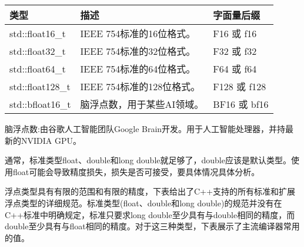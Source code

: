 \begin{longtable}{|l|l|l|}
\hline
\textbf{类型}    & \textbf{描述}                               & \textbf{字面量后缀} \\ \hline
\endfirsthead
%
\endhead
%
std::float16\_t  & IEEE 754标准的16位格式。         & F16 或 f16              \\ \hline
std::float32\_t  & IEEE 754标准的32位格式。          & F32 或 f32              \\ \hline
std::float64\_t  & IEEE 754标准的64位格式。          & F64 或 f64              \\ \hline
std::float128\_t & IEEE 754标准的128位格式。         & F128 或 f128            \\ \hline
std::bfloat16\_t & 脑浮点数，用于某些AI领域。 & BF16 或 bf16            \\ \hline
\end{longtable}

脑浮点数:由谷歌人工智能团队Google Brain开发。用于人工智能处理器，并持最新的NVIDIA GPU。

通常，标准类型float、double和long double就足够了，double应该是默认类型。使用float可能会导致精度损失，损失是否可接受，要具体情况具体分析。


浮点类型具有有限的范围和有限的精度，下表给出了C++支持的所有标准和扩展浮点类型的详细规范。标准类型(float、double和long double)的规范并没有在C++标准中明确规定，标准只要求long double至少具有与double相同的精度，而double至少具有与float相同的精度。对于这三种类型，下表展示了主流编译器常用的值。

